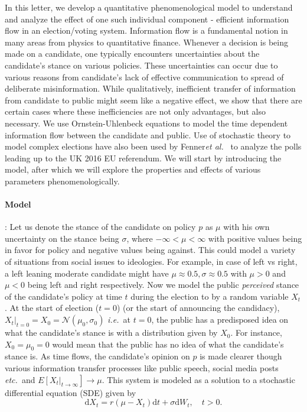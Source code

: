 \documentclass[aps,prl,twocolumn,showpacs,final]{revtex4-1}
\newcommand{\etal}{\textit{et al.\ }}
\newcommand{\ie}{\textit{i.e.\ }}
\newcommand{\etc}{\textit{etc.\ }}
\newcommand\at[2]{\left.#1\right|_{#2}}
\newcommand\pN{\mathcal{N}}
\begin{document}
In this letter, we develop a quantitative phenomenological model to understand and analyze the effect of one such individual component - efficient information flow in an election/voting system. Information flow is a fundamental notion in many areas from physics to quantitative finance. Whenever a decision is being made on a candidate, one typically encounters uncertainties about the candidate's stance on various policies. These uncertainties can occur due to various reasons from  candidate's lack of effective communication to spread of  deliberate misinformation. While qualitatively, inefficient transfer of information from candidate to public might seem like a negative effect, we show that there are certain cases where these inefficiencies are not only advantages, but also necessary.  We use Ornstein-Uhlenbeck equations\cite{PhysRev.36.823} to model the time dependent information flow between the candidate and public. Use of stochastic theory to model complex elections have also been used by Fenner\etal \cite{fenner2018stochastic} to analyze the polls leading up to the UK 2016 EU referendum. We will start by introducing the model, after which we will explore the properties and effects of various parameters phenomenologically.


\paragraph*{Model}: Let us denote the stance of the candidate on policy $p$ as $\mu$ with his own uncertainty on the stance being $\sigma$, where $-\infty<\mu<\infty$ with positive values being in favor for policy and negative values being against. This could model a variety of situations from social issues to ideologies. For example, in case of left vs right, a left leaning moderate candidate might have $\mu\approx 0.5,\sigma\approx 0.5$ with $\mu>0$ and $\mu<0$ being left and right respectively. Now we model the public \textit{perceived} stance of the candidate's policy at time $t$ during the election to by a random variable  $X_t$. At the start of election ($t=0$) (or the start of announcing the candidacy), $\at{X_t}{t=0} = X_0=\pN(\mu_0,\sigma_0)$ \ie at $t=0$, the public has a predisposed idea on what the candidate's stance is with a distribution given by $X_0$. For instance, $X_0=\mu_0=0$ would mean that the public has no idea of what the candidate's stance is. As time flows, the candidate's opinion on $p$ is made clearer though various information transfer processes like public speech, social media posts \etc and $\at{E\left[X_t}{t\rightarrow\infty}\right]\rightarrow \mu$. This system is modeled as a solution to a stochastic differential equation (SDE) given by 
\begin{equation}
\mathrm{d} X_{t}=r\left(\mu-X_{t}\right) \mathrm{d} t+\sigma \mathrm{d} W_{t}, \quad t>0 \label{eq:1}. 
\end{equation}
\end{document}
